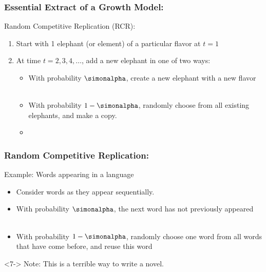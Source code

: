 \begin{frame}
  \frametitle{Essential Extract of a Growth Model:}

  \begin{block}{Random Competitive Replication (RCR):}
    \begin{enumerate}
    \item<1-> Start with 1 elephant (or element) of a particular flavor at $t=1$
    \item<2-> At time $t=2,3,4,\ldots$, add a new elephant in
      one of two ways:
      \begin{itemize}
      \item<2-> With probability $\simonalpha$, create a new elephant
        with a new flavor\\
        \\
        \bigskip
      \item<3-> With probability $1-\simonalpha$, randomly choose
        from all existing elephants, and make a copy.\\
        \bigskip
      \item<4-> 
      \end{itemize}
    \end{enumerate}
  \end{block}

\end{frame}

\begin{frame}
  \frametitle{Random Competitive Replication:}
  
  \begin{block}{Example: Words appearing in a language}
    \begin{itemize}
    \item<2-> Consider words as they appear sequentially.
    \item<3-> With probability $\simonalpha$, the next word
      has not previously appeared\\
      \\
      \bigskip
    \item<4-> With probability $1-\simonalpha$, randomly choose
      one word from all words that have come before, and reuse this word\\
    \end{itemize}
  \end{block}

  \begin{block}<7->{}
    Note: This is a terrible way to write a novel.
  \end{block}

\end{frame}

